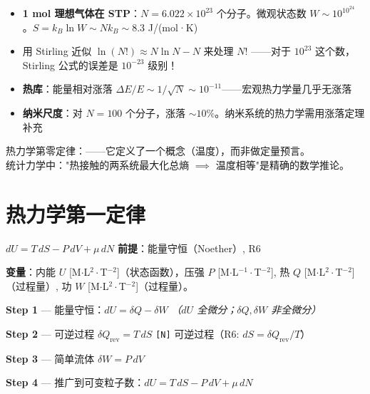 
\begin{oombox}[宏观熵与微观状态数]
  \begin{itemize}
    \item \textbf{1 mol 理想气体在 STP}：$N=6.022\times 10^{23}$ 个分子。微观状态数 $W \sim 10^{10^{24}}$。$S = k_B\ln W \sim Nk_B \sim 8.3$ J/(mol·K)
    \item 用 Stirling 近似 $\ln(N!) \approx N\ln N - N$ 来处理 $N!$ ——对于 $10^{23}$ 这个数，Stirling 公式的误差是 $10^{-23}$ 级别！
    \item \textbf{热库}：能量相对涨落 $\Delta E/E \sim 1/\sqrt{N} \sim 10^{-11}$——宏观热力学量几乎无涨落
    \item \textbf{纳米尺度}：对 $N=100$ 个分子，涨落 $\sim 10\%$。纳米系统的热力学需用涨落定理补充
  \end{itemize}
\end{oombox}

\precisionbox[精度等级]
  热力学第零定律：\precqualitative——它定义了一个概念（温度），而非做定量预言。\\
  统计力学中："热接触的两系统最大化总熵 $\implies$ 温度相等"是精确的数学推论。
\endprecisionbox

\section{热力学第一定律}

\begin{lawbox}[热力学第一定律]
  $dU = T\,dS - P\,dV + \mu\,dN$
  \quad\textbf{前提}：能量守恒（Noether）, R6
\end{lawbox}

\noindent\textbf{变量}：内能 $U$ [M$\cdot$L$^2\cdot$T$^{-2}$]（状态函数），压强 $P$ [M$\cdot$L$^{-1}\cdot$T$^{-2}$],
热 $Q$ [M$\cdot$L$^2\cdot$T$^{-2}$]（过程量）, 功 $W$ [M$\cdot$L$^2\cdot$T$^{-2}$]（过程量）。

\begin{derivationbox}[推导]
  \textbf{Step 1} — 能量守恒：$dU = \delta Q - \delta W$
  \hfill\textit{（$dU$ 全微分；$\delta Q,\delta W$ 非全微分）}

  \textbf{Step 2} — 可逆过程 $\delta Q_{\text{rev}} = T\,dS$
  \hfill\texttt{[N]} 可逆过程（R6: $dS = \delta Q_{\text{rev}}/T$）

  \textbf{Step 3} — 简单流体 $\delta W = P\,dV$

  \textbf{Step 4} — 推广到可变粒子数：$dU = T\,dS - P\,dV + \mu\,dN$
\end{derivationbox}

